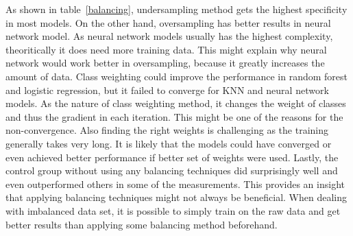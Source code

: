 \documentclass{article}
\begin{document}
As shown in table~\ref{balancing}, undersampling method gets the highest specificity in most models. On the other hand, oversampling has better results in neural network model. As neural network models usually has the highest complexity, theoritically it does need more training data. This might explain why neural network would work better in oversampling, because it greatly increases the amount of data. Class weighting could improve the performance in random forest and logistic regression, but it failed to converge for KNN and neural network models. As the nature of class weighting method, it changes the weight of classes and thus the gradient in each iteration. This might be one of the reasons for the non-convergence. Also finding the right weights is challenging as the training generally takes very long. It is likely that the models could have converged or even achieved better performance if better set of weights were used. Lastly, the control group without using any balancing techniques did surprisingly well and even outperformed others in some of the measurements. This provides an insight that applying balancing techniques might not always be beneficial. When dealing with imbalanced data set, it is possible to simply train on the raw data and get better results than applying some balancing method beforehand.
\end{document}
